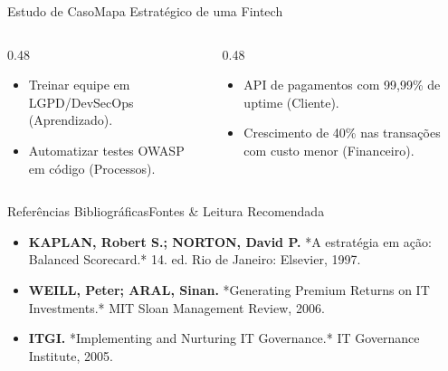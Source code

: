 \begin{senaiframe}{Estudo de Caso}{Mapa Estratégico de uma Fintech}
  \begin{columns}[t]
    \begin{column}{0.48\textwidth}
      \begin{tcolorbox}[senaibluecard, title={Iniciativas Mapeadas}]
        \begin{itemize}
          \item Treinar equipe em LGPD/DevSecOps (Aprendizado).
          \item Automatizar testes OWASP em código (Processos).
        \end{itemize}
      \end{tcolorbox}
    \end{column}
    \begin{column}{0.48\textwidth}
      \begin{tcolorbox}[senaigreencard, title={Resultados Alcançados}]
        \begin{itemize}
          \item API de pagamentos com 99,99\% de uptime (Cliente).
          \item Crescimento de 40\% nas transações com custo menor (Financeiro).
        \end{itemize}
      \end{tcolorbox}
    \end{column}
  \end{columns}
\end{senaiframe}

\begin{senaiframe}{Referências Bibliográficas}{Fontes \& Leitura Recomendada}
  \begin{tcolorbox}[senaicard, title={Obras de Referência}]
    \begin{itemize}
      \item \textbf{KAPLAN, Robert S.; NORTON, David P.} *A estratégia em ação: Balanced Scorecard.* 14. ed. Rio de Janeiro: Elsevier, 1997.
      \item \textbf{WEILL, Peter; ARAL, Sinan.} *Generating Premium Returns on IT Investments.* MIT Sloan Management Review, 2006.
      \item \textbf{ITGI.} *Implementing and Nurturing IT Governance.* IT Governance Institute, 2005.
    \end{itemize}
  \end{tcolorbox}
\end{senaiframe}

